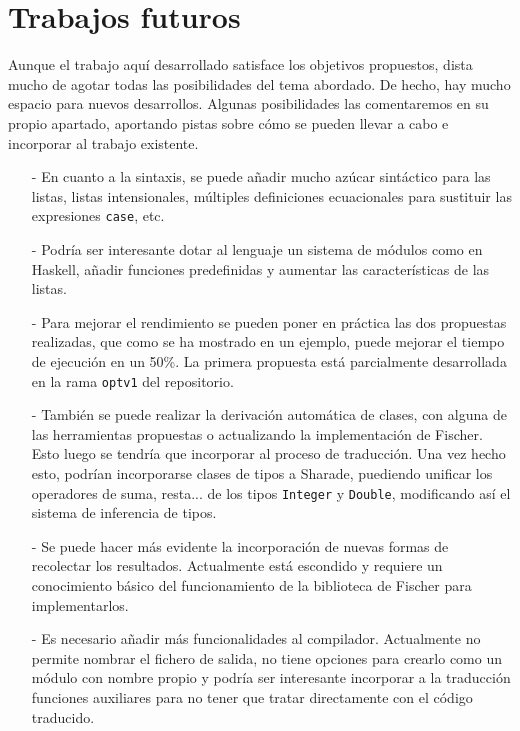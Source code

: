 \documentclass[class=article, crop=false]{standalone}
\begin{document}
\section{Trabajos futuros}
Aunque el trabajo aquí desarrollado satisface los objetivos propuestos, dista mucho de agotar
todas las posibilidades del tema abordado. De hecho, hay mucho espacio para nuevos
desarrollos. Algunas posibilidades las comentaremos en su propio apartado, aportando pistas
sobre cómo se pueden llevar a cabo e incorporar al trabajo existente. 

\begin{itemize}
  \item[-] En cuanto a la sintaxis, se puede añadir mucho azúcar sintáctico para las listas,
  listas intensionales, múltiples definiciones ecuacionales para sustituir las expresiones
  \verb`case`, etc.

  \item[-] Podría ser interesante dotar al lenguaje un sistema de módulos como en Haskell,
  añadir funciones predefinidas y aumentar las características de las listas.

  \item[-] Para mejorar el rendimiento se pueden poner en práctica las dos propuestas
  realizadas, que como se ha mostrado en un ejemplo, puede mejorar el tiempo de ejecución en
  un 50\%. La primera propuesta está parcialmente desarrollada en la rama \verb`optv1` del
  repositorio.

  \item[-] También se puede realizar la derivación automática de clases, con alguna de las
  herramientas propuestas o actualizando la implementación de Fischer. Esto luego se tendría
  que incorporar al proceso de traducción. Una vez hecho esto, podrían incorporarse clases de
  tipos a Sharade, puediendo unificar los operadores de suma, resta... de los tipos
  \verb`Integer` y \verb`Double`, modificando así el sistema de inferencia de
  tipos\cite{smith1994principal}.

  \item[-] Se puede hacer más evidente la incorporación de nuevas formas de recolectar los
  resultados. Actualmente está escondido y requiere un conocimiento básico del funcionamiento
  de la biblioteca de Fischer para implementarlos.

  \item[-] Es necesario añadir más funcionalidades al compilador. Actualmente no permite
  nombrar el fichero de salida, no tiene opciones para crearlo como un módulo con nombre
  propio y podría ser interesante incorporar a la traducción funciones auxiliares para no
  tener que tratar directamente con el código traducido.
\end{itemize}
\end{document}
